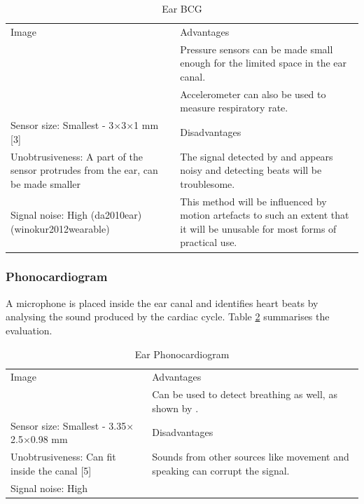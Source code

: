 \begin{table}[H]
\caption{Ear BCG}
\label{tab:EarBCG_Eval}
\renewcommand{\arraystretch}{1.3}	%
\centering
\begin{tabular}{|p{5cm}|p{8cm}|} 
 \hline
 Image 		& 	Advantages  \\ 
  			&	\tabitem Pressure sensors can be made small enough for the limited space in the ear canal.\\
  			&	\tabitem Accelerometer can also be used to measure respiratory rate.\\
\hline
Sensor size: Smallest - 3$\times$3$\times$1 mm	[3]									&	Disadvantages  \\ 
Unobtrusiveness: A part of the sensor protrudes from the ear, can be made smaller 	&	\tabitem The signal detected by \cite{da2010ear} and \cite{winokur2012wearable} appears noisy and detecting beats will be troublesome.\\
Signal noise: High (da2010ear) (winokur2012wearable) 							&	\tabitem This method will be influenced by motion artefacts to such an extent that it will be unusable for most forms of practical use.\\
 
 \hline
\end{tabular}
\end{table}

\subsubsection{Phonocardiogram}
A microphone is placed inside the ear canal and identifies heart beats by analysing the sound produced by the cardiac cycle. Table \ref{tab:EarPhonocardiogram_Eval} summarises the evaluation.

\begin{table}[H]
\caption{Ear Phonocardiogram}
\label{tab:EarPhonocardiogram_Eval}
\renewcommand{\arraystretch}{1.3}	%
\centering
\begin{tabular}{|p{5cm}|p{8cm}|} 
 \hline
 Image 		& 	Advantages  \\ 
  			&	\tabitem Can be used to detect breathing as well, as shown by \cite{goverdovsky2016hearables}.\\
\hline
Sensor size: Smallest - 3.35$\times$2.5$\times$0.98 mm	&	Disadvantages  \\ 
Unobtrusiveness: Can fit inside the canal [5]			&	\tabitem Sounds from other sources like movement and speaking can corrupt the signal.\\
Signal noise: High 								&	\\
 
 \hline
\end{tabular}
\end{table}

